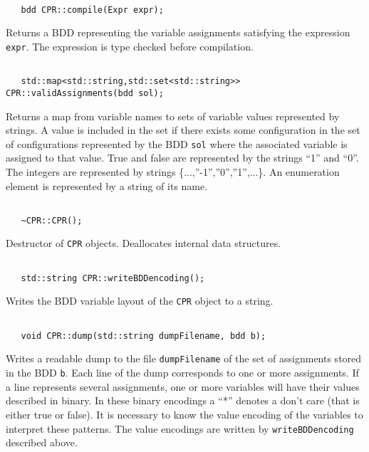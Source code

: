 \documentclass{article}
\begin{document}
\noindent
\hrulefill

\begin{verbatim}

   bdd CPR::compile(Expr expr);

\end{verbatim}
Returns a BDD representing the variable assignments satisfying the expression \texttt{expr}. The
expression is type checked before compilation.

\noindent
\hrulefill

\begin{verbatim}

   std::map<std::string,std::set<std::string>> CPR::validAssignments(bdd sol);

\end{verbatim}
Returns a map from variable names to sets of variable values
represented by strings. A value is included in the set if there exists
some configuration in the set of configurations represented by the BDD
\texttt{sol} where the associated variable is assigned to that value.
True and false are represented by the strings ``1'' and ``0''. The
integers are represented by strings
\{...,''-1'',''0'',''1'',...\}. An enumeration element is represented
by a string of its name.

\noindent
\hrulefill

\begin{verbatim}

   ~CPR::CPR();

\end{verbatim}
Destructor of \texttt{CPR} objects. Deallocates internal data structures.

\noindent
\hrulefill

\begin{verbatim}

   std::string CPR::writeBDDencoding();

\end{verbatim}
Writes the BDD variable layout of the \texttt{CPR} object to a string.

\noindent
\hrulefill

\begin{verbatim}

   void CPR::dump(std::string dumpFilename, bdd b);

\end{verbatim}
Writes a readable dump to the file \texttt{dumpFilename} of the set of
assignments stored in the BDD \texttt{b}. Each line of the dump
corresponds to one or more assignments. If a line represents several
assignments, one or more variables will have their values described in
binary.  In these binary encodings a ``*'' denotes a don't care (that is
either true or false). It is necessary to know the value encoding of the
variables to interpret these patterns. The value encodings are written
by \texttt{writeBDDencoding} described above. 
\end{document}
